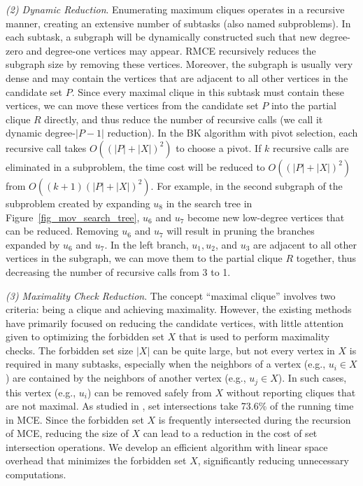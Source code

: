 \documentclass[sigconf, nonacm]{acmart}
\begin{document}
\noindent\textit{(2) Dynamic Reduction}. Enumerating maximum cliques operates in a recursive manner, creating an extensive number of subtasks (also named subproblems). In each subtask, a subgraph will be dynamically constructed such that new degree-zero and degree-one vertices may appear. RMCE recursively reduces the subgraph size by removing these vertices.
Moreover, the subgraph is usually very dense and may contain the vertices that are adjacent to all other vertices in the candidate set $P$.
Since every maximal clique in this subtask must contain these vertices, we can move these vertices from the candidate set $P$ into the partial clique $R$ directly, and thus reduce the number of recursive calls (we call it dynamic degree-$\lvert P-1\rvert$ reduction).
 In the BK algorithm with pivot selection, each recursive call takes $O((|P|+|X|)^2)$ to choose a pivot. If $k$ recursive calls are eliminated in a subproblem, the time cost will be reduced to $O((|P|+|X|)^2)$ from $O((k+1)(|P|+|X|)^2)$. For example, in the second subgraph of the subproblem created by expanding $u_8$ in the search tree in Figure~\ref{fig_mov_search_tree}, $u_6$ and $u_7$ become new low-degree vertices that can be reduced. Removing $u_6$ and $u_7$ will result in pruning the branches expanded by $u_6$ and $u_7$. In the left branch, $u_1,u_2$, and $u_3$ are adjacent to all other vertices in the subgraph, we can move them to the partial clique $R$ together, thus decreasing the number of recursive calls from 3 to 1.

\noindent\textit{(3) Maximality Check Reduction}. 
The concept ``maximal clique'' involves two criteria: being a clique and achieving maximality. However, the existing methods 
have primarily focused on reducing the candidate vertices, with little attention given to optimizing the forbidden set $X$ that is used to perform maximality checks. The forbidden set size $\lvert X\rvert$ can be quite large, but not every vertex in $X$ is required in many subtasks, 
especially when the neighbors of a vertex (e.g., $u_i \in X$) are contained by the neighbors of another vertex (e.g., $u_j \in X$). In such cases, this vertex (e.g., $u_i$) can be removed safely from $X$ without reporting cliques that are not maximal. 
As studied in \cite{han2018speeding}, set intersections take 73.6\% of the running time in MCE. Since the forbidden set $X$ is frequently intersected during the recursion of MCE, reducing the size of $X$ can lead to a reduction in the cost of set intersection operations.
We develop an efficient algorithm with linear space overhead that minimizes the forbidden set $X$, significantly reducing unnecessary computations.
\end{document}
